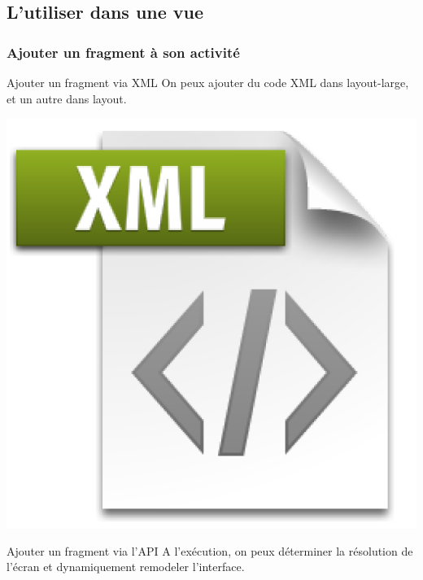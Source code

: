 \documentclass{beamer}
\begin{document}
\subsection{L'utiliser dans une vue}

\begin{frame}
\frametitle{Ajouter un fragment à son activité}
\begin{block}{Ajouter un fragment via XML}
On peux ajouter du code XML dans layout-large, et un autre dans layout.
\end{block}
\begin{center}
\includegraphics[scale=0.05]{xml-file.png}
\end{center}
\begin{block}{Ajouter un fragment via l'API}
A l’exécution, on peux déterminer la résolution de l’écran et dynamiquement remodeler l'interface.
\end{block}
\begin{center}

\end{center}
\end{frame}
\end{document}
